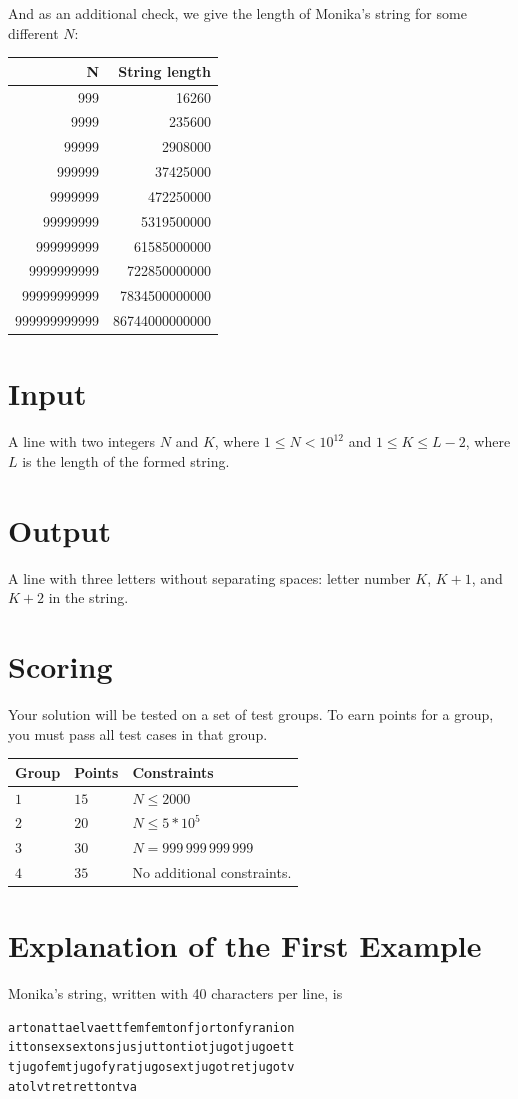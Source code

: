 And as an additional check, we give the length of Monika's string for some different $N$:

\begin{tabular}{|r|r|}\hline
{\bf N} & {\bf String length} \\ \hline
999 & 16260 \\
9999 & 235600 \\
99999 & 2908000 \\
999999 & 37425000 \\
9999999   & 472250000 \\
99999999 & 5319500000\\
999999999 & 61585000000\\
9999999999 & 722850000000 \\
99999999999 &	7834500000000 \\
999999999999 &86744000000000 \\ \hline
\end{tabular}


\section*{Input}
A line with two integers $N$ and $K$, where $1 \leq N < 10^{12}$ and $1 \leq K \leq L-2$, where $L$ is the length of the formed string.

\section*{Output}
A line with three letters without separating spaces: letter number $K$, $K+1$, and $K+2$ in the string. 

\section*{Scoring}
Your solution will be tested on a set of test groups.
To earn points for a group, you must pass all test cases in that group.

\noindent
\begin{tabular}{| l | l | p{12cm} |}
  \hline
  \textbf{Group} & \textbf{Points} & \textbf{Constraints} \\ \hline
  $1$   & $15$       & $N \leq 2000 $\\ \hline
  $2$   & $20$       & $N \leq 5*10^5 $\\ \hline
  $3$   & $30$       & $N = 999\,999\,999\,999 $\\ \hline
  $4$   & $35$       & No additional constraints. \\ \hline
\end{tabular}

\section*{Explanation of the First Example}

Monika's string, written with 40 characters per line, is

\begin{verbatim}
artonattaelvaettfemfemtonfjortonfyranion
ittonsexsextonsjusjuttontiotjugotjugoett
tjugofemtjugofyratjugosextjugotretjugotv
atolvtretrettontva
\end{verbatim}
